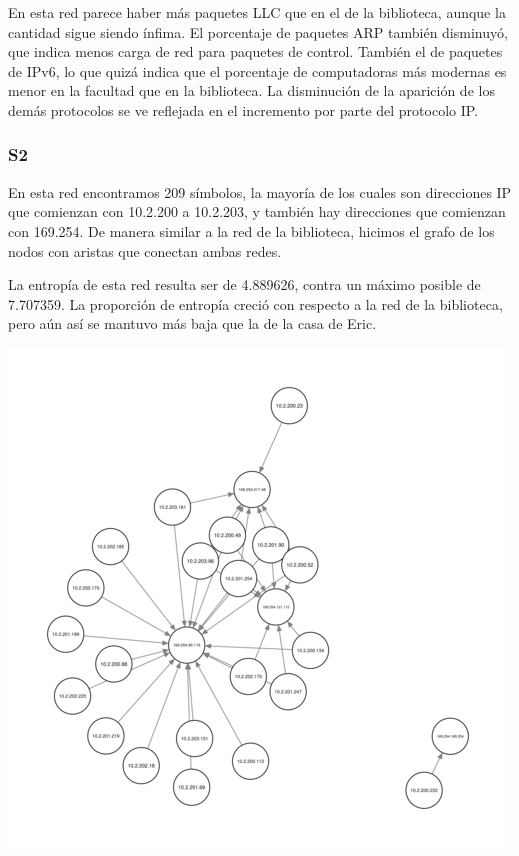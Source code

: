 En esta red parece haber más paquetes LLC que en el de la biblioteca, aunque la 
cantidad sigue siendo ínfima. El porcentaje de paquetes ARP también disminuyó,
que indica menos carga de red para paquetes de control. También el de paquetes
de IPv6, lo que quizá indica que el porcentaje de computadoras más modernas
es menor en la facultad que en la biblioteca. La disminución de la aparición
de los demás protocolos se ve reflejada en el incremento por parte del protocolo
IP.

\subsubsection{S2}
En esta red encontramos 209 símbolos, la mayoría de los cuales son 
direcciones IP
que comienzan con 10.2.200 a 10.2.203, y también hay direcciones
que comienzan con 169.254. De manera similar a la red de la biblioteca,
hicimos el grafo de los nodos con aristas que conectan ambas redes.

La entropía de esta red resulta ser de 4.889626, contra un máximo posible
de 7.707359. La proporción de entropía creció con respecto a la red 
de la biblioteca, pero aún así se mantuvo más baja que la de la casa
de Eric.

\begin{center}
\includegraphics[scale=0.6]{../img/exactas-redesAB.png} 
\end{center}

